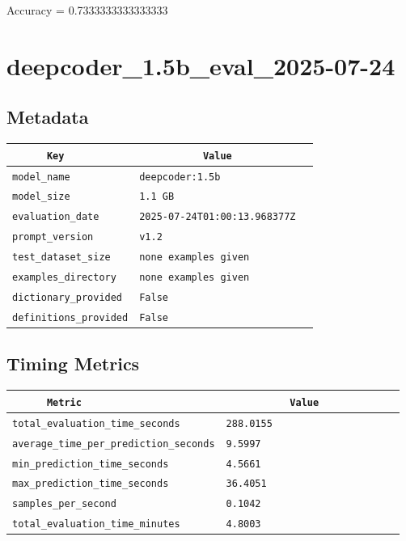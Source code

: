 \documentclass{article}
\begin{document}
\begin{center}
Accuracy = 0.7333333333333333
\end{center}

\section{deepcoder\_1.5b\_eval\_2025-07-24}
\subsection{Metadata}

\begin{center}
\begin{tabular}{l | l} \hline
    \verb|      Key      | & \verb|           Value           | \\ \hline
    \hline
    \verb|model_name    | & \verb|deepcoder:1.5b               | \\ \hline
    \verb|model_size    | & \verb|1.1 GB                       | \\ \hline
    \verb|evaluation_date| & \verb|2025-07-24T01:00:13.968377Z  | \\ \hline
    \verb|prompt_version| & \verb|v1.2                         | \\ \hline
    \verb|test_dataset_size| & \verb|none examples given          | \\ \hline
    \verb|examples_directory| & \verb|none examples given          | \\ \hline
    \verb|dictionary_provided| & \verb|False                        | \\ \hline
    \verb|definitions_provided| & \verb|False                        | \\ \hline
\end{tabular}
\end{center}

\subsection{Timing Metrics}

\begin{center}
\begin{tabular}{l | l} \hline
    \verb|      Metric     | & \verb|           Value           | \\ \hline
    \hline
    \verb|total_evaluation_time_seconds| & \verb|288.0155                     | \\ \hline
    \verb|average_time_per_prediction_seconds| & \verb|9.5997                       | \\ \hline
    \verb|min_prediction_time_seconds| & \verb|4.5661                       | \\ \hline
    \verb|max_prediction_time_seconds| & \verb|36.4051                      | \\ \hline
    \verb|samples_per_second| & \verb|0.1042                       | \\ \hline
    \verb|total_evaluation_time_minutes| & \verb|4.8003                       | \\ \hline
\end{tabular}
\end{center}
\end{document}
